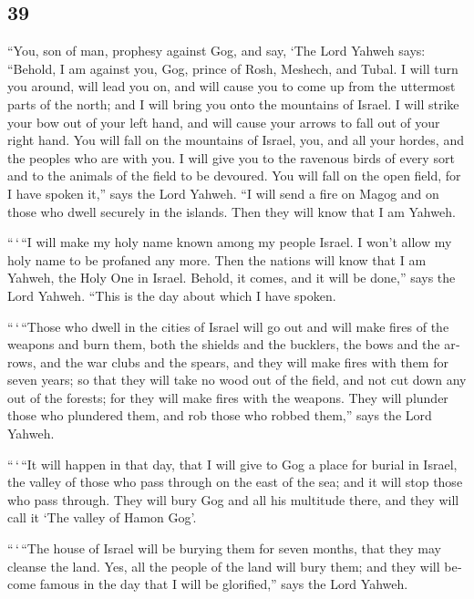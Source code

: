 \begin{paracol}{2}
\switchcolumn
\begin{otherlanguage}{english}

\hypertarget{section-77}{%
\section{39}\label{section-77}}

 ``You, son of man, prophesy against Gog, and say, `The
Lord Yahweh says: ``Behold, I am against you, Gog, prince of Rosh,
Meshech, and Tubal.  I will turn you around, will lead you
on, and will cause you to come up from the uttermost parts of the north;
and I will bring you onto the mountains of Israel.  I will
strike your bow out of your left hand, and will cause your arrows to
fall out of your right hand.  You will fall on the
mountains of Israel, you, and all your hordes, and the peoples who are
with you. I will give you to the ravenous birds of every sort and to the
animals of the field to be devoured.  You will fall on the
open field, for I have spoken it,'' says the Lord Yahweh. 
``I will send a fire on Magog and on those who dwell securely in the
islands. Then they will know that I am Yahweh.

 ``\,`\,``I will make my holy name known among my people
Israel. I won't allow my holy name to be profaned any more. Then the
nations will know that I am Yahweh, the Holy One in Israel.
 Behold, it comes, and it will be done,'' says the Lord
Yahweh. ``This is the day about which I have spoken.

 ``\,`\,``Those who dwell in the cities of Israel will go
out and will make fires of the weapons and burn them, both the shields
and the bucklers, the bows and the arrows, and the war clubs and the
spears, and they will make fires with them for seven years;
 so that they will take no wood out of the field, and not
cut down any out of the forests; for they will make fires with the
weapons. They will plunder those who plundered them, and rob those who
robbed them,'' says the Lord Yahweh.

 ``\,`\,``It will happen in that day, that I will give to
Gog a place for burial in Israel, the valley of those who pass through
on the east of the sea; and it will stop those who pass through. They
will bury Gog and all his multitude there, and they will call it `The
valley of Hamon Gog'.

 ``\,`\,``The house of Israel will be burying them for
seven months, that they may cleanse the land.  Yes, all
the people of the land will bury them; and they will become famous in
the day that I will be glorified,'' says the Lord Yahweh.


\end{otherlanguage}
\end{paracol}
